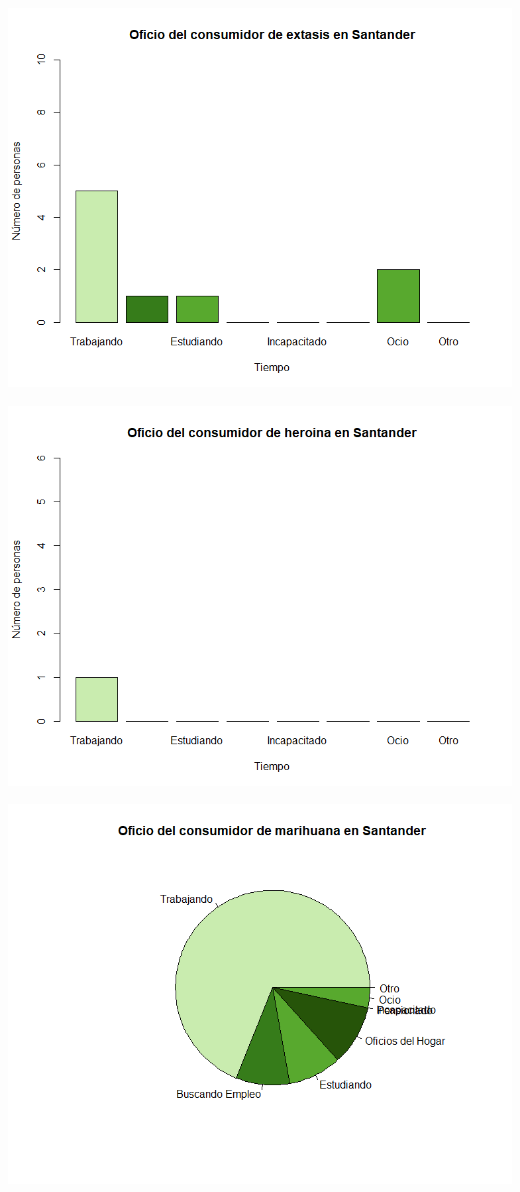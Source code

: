 \documentclass[
]{article}
\begin{document}
\includegraphics{images/extasis oficio santander.png}

\includegraphics{images/heroina oficio santander.png}

\includegraphics{images/marihuana oficio santander.png}
\end{document}
